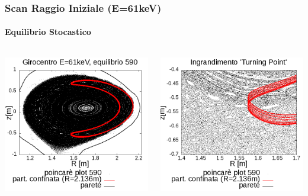 \begin{frame}
\frametitle{Scan Raggio Iniziale (E=61keV)}
\framesubtitle{Equilibrio Stocastico}
\begin{columns}
	\begin{column}{0.4\textwidth}
		\begin{center}
		\includegraphics[scale=0.28]{Immagini/Simulazioni/Single/590/R_2136_E_61k.png}
		\end{center}
	\end{column}
	\begin{column}{0.4\textwidth}
		\begin{center}
		\includegraphics[scale=0.28]{Immagini/Simulazioni/Single/590/confronto_zoom.png}
		\end{center}
	\end{column}
\end{columns}
\end{frame}



